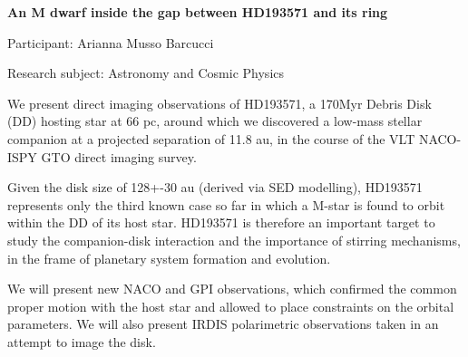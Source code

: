\begin{minipage}[t]{1.0\textwidth}

\begin{center}

{{\large\bfseries An M dwarf inside the gap between HD193571 and its ring}\par}

\end{center}

{\noindent Participant: Arianna Musso Barcucci\par} 

{\noindent Research subject: Astronomy and Cosmic Physics\par}\medskip

\noindent We present direct imaging observations of HD193571, a 170Myr Debris Disk (DD) hosting star at 66 pc, around which we discovered a low-mass stellar companion at a projected separation of 11.8 au, in the course of the VLT NACO-ISPY GTO direct imaging survey.

Given the disk size of 128+-30 au (derived via SED modelling), HD193571 represents only the third known case so far in which a M-star is found to orbit within the DD of its host star. HD193571 is therefore an important target to study the companion-disk interaction and the importance of stirring mechanisms, in the frame of planetary system formation and evolution.

We will present new NACO and GPI observations, which confirmed the common proper motion with the host star and allowed to place constraints on the orbital parameters. We will also present IRDIS polarimetric observations taken in an attempt to image the disk.\par\end{minipage}

\hfill 

